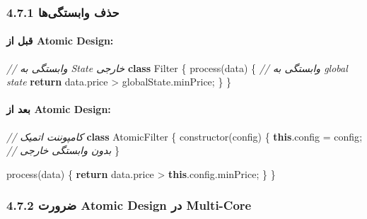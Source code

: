 \documentclass[
]{article}
\newenvironment{Shaded}{}{}
\newcommand{\AttributeTok}[1]{\textcolor[rgb]{0.49,0.56,0.16}{#1}}
\newcommand{\BuiltInTok}[1]{\textcolor[rgb]{0.00,0.50,0.00}{#1}}
\newcommand{\CommentTok}[1]{\textcolor[rgb]{0.38,0.63,0.69}{\textit{#1}}}
\newcommand{\ControlFlowTok}[1]{\textcolor[rgb]{0.00,0.44,0.13}{\textbf{#1}}}
\newcommand{\FunctionTok}[1]{\textcolor[rgb]{0.02,0.16,0.49}{#1}}
\newcommand{\KeywordTok}[1]{\textcolor[rgb]{0.00,0.44,0.13}{\textbf{#1}}}
\newcommand{\NormalTok}[1]{#1}
\newcommand{\OperatorTok}[1]{\textcolor[rgb]{0.40,0.40,0.40}{#1}}
\begin{document}
\subsubsection{4.7.1 حذف
وابستگی‌ها}\label{ux62dux630ux641-ux648ux627ux628ux633ux62aux6afux6ccux647ux627}

\paragraph{قبل از Atomic
Design:}\label{ux642ux628ux644-ux627ux632-atomic-design}

\begin{Shaded}
\begin{Highlighting}[]
\CommentTok{// وابستگی به State خارجی}
\KeywordTok{class}\NormalTok{ Filter \{}
  \BuiltInTok{process}\NormalTok{(data) \{}
    \CommentTok{// وابستگی به global state}
    \ControlFlowTok{return}\NormalTok{ data}\OperatorTok{.}\AttributeTok{price} \OperatorTok{\textgreater{}}\NormalTok{ globalState}\OperatorTok{.}\AttributeTok{minPrice}\OperatorTok{;}
\NormalTok{  \}}
\NormalTok{\}}
\end{Highlighting}
\end{Shaded}

\paragraph{بعد از Atomic
Design:}\label{ux628ux639ux62f-ux627ux632-atomic-design}

\begin{Shaded}
\begin{Highlighting}[]
\CommentTok{// کامپوننت اتمیک}
\KeywordTok{class}\NormalTok{ AtomicFilter \{}
  \FunctionTok{constructor}\NormalTok{(config) \{}
    \KeywordTok{this}\OperatorTok{.}\AttributeTok{config} \OperatorTok{=}\NormalTok{ config}\OperatorTok{;} \CommentTok{// بدون وابستگی خارجی}
\NormalTok{  \}}

  \BuiltInTok{process}\NormalTok{(data) \{}
    \ControlFlowTok{return}\NormalTok{ data}\OperatorTok{.}\AttributeTok{price} \OperatorTok{\textgreater{}} \KeywordTok{this}\OperatorTok{.}\AttributeTok{config}\OperatorTok{.}\AttributeTok{minPrice}\OperatorTok{;}
\NormalTok{  \}}
\NormalTok{\}}
\end{Highlighting}
\end{Shaded}

\subsubsection{4.7.2 ضرورت Atomic Design در
Multi-Core}\label{ux636ux631ux648ux631ux62a-atomic-design-ux62fux631-multi-core}
\end{document}
